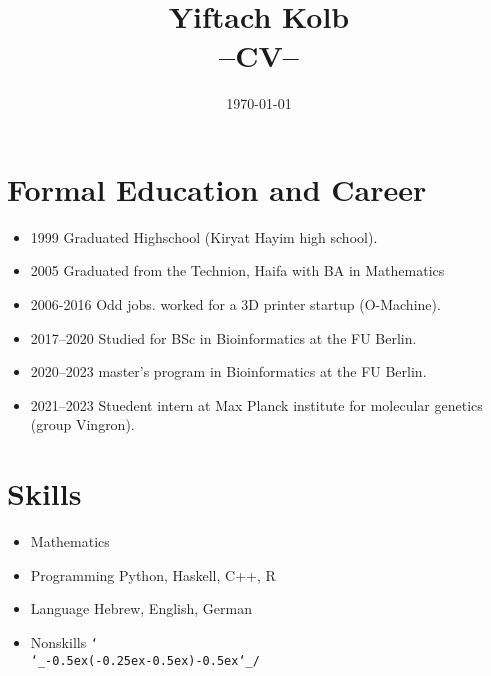 \documentclass[a4paper,10pt]{article}
\def\shrug{\texttt{\raisebox{0.75em}{\char`\_}\char`\\\char`\_\kern-0.5ex(\kern-0.25ex\raisebox{0.25ex}{\rotatebox{45}{\raisebox{-.75ex}"\kern-1.5ex\rotatebox{-90})}}\kern-0.5ex)\kern-0.5ex\char`\_/\raisebox{0.75em}{\char`\_}}}
\begin{document}



\title{
Yiftach Kolb \\
--CV--
}

\date{\today}

\maketitle

\section*{Formal Education and Career}

\begin{itemize}
\item{1999} Graduated Highschool (Kiryat Hayim high school).
\item{2005} Graduated from the Technion, Haifa with BA in Mathematics
\item{2006-2016} Odd jobs.
worked for a 3D printer startup (O-Machine).
\item{2017--2020} Studied for BSc in Bioinformatics at the FU Berlin.
\item{2020--2023} master's program in Bioinformatics at the FU Berlin.
\item{2021--2023} Stuedent intern at Max Planck institute for molecular genetics (group Vingron).
\end{itemize}

\section*{Skills}
\begin{itemize}
\item{Mathematics}
\item{Programming}
\subitem{} Python, Haskell, C++, R
\item{Language}
\subitem{} Hebrew, English, German
\item{Nonskills}
\subitem{}
\normalsize\shrug


\end{itemize}
\end{document}
